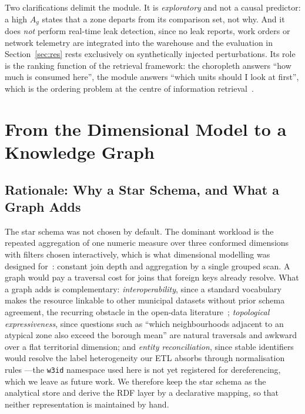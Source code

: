 \documentclass[runningheads]{llncs}
\newif\ifmarcarcambios
\newcommand{\icokg}[1]{\ifmarcarcambios\textcolor{nuevo}{#1}\else#1\fi}
\newenvironment{icokgblock}{\ifmarcarcambios\color{nuevo}\fi}{}
\renewcommand{\_}{\origunderscore\allowbreak}
\begin{document}
\begin{icokgblock}
Two clarifications delimit the module. It is \emph{exploratory} and not a causal
predictor: a high $A_g$ states that a zone departs from its comparison set, not
why. And it does \emph{not} perform real-time leak detection, since no leak
reports, work orders or network telemetry are integrated into the warehouse and
the evaluation in Section~\ref{sec:res} rests exclusively on synthetically
injected perturbations. Its role is the ranking function of the retrieval
framework: the choropleth answers ``how much is consumed here'', the module
answers ``which units should I look at first'', which is the ordering problem at
the centre of information retrieval~\cite{purves2018}.
\end{icokgblock}

\begin{icokgblock}
\section{From the Dimensional Model to a Knowledge Graph}
\label{sec:kg}

\subsection{Rationale: Why a Star Schema, and What a Graph Adds}

The star schema was not chosen by default. The dominant workload is the repeated
aggregation of one numeric measure over three conformed dimensions with filters
chosen interactively, which is what dimensional modelling was designed
for~\cite{kimball}: constant join depth and aggregation by a single grouped scan.
A graph would pay a traversal cost for joins that foreign keys already resolve.
What a graph adds is complementary: \emph{interoperability}, since a standard
vocabulary makes the resource linkable to other municipal datasets without prior schema
agreement, the recurring obstacle in the open-data literature~\cite{vetro2016}; \emph{topological expressiveness}, since
questions such as ``which neighbourhoods adjacent to an atypical zone also exceed
the borough mean'' are natural traversals and awkward over a flat territorial
dimension; and \emph{entity reconciliation}, since \icokg{stable identifiers would resolve
the label heterogeneity our ETL absorbs through normalisation rules ---the
\texttt{w3id} namespace used here is not yet registered for dereferencing, which
we leave as future work}. We
therefore keep the star schema as the analytical store and derive the RDF layer
by a declarative mapping, so that neither representation is maintained by hand.


\end{icokgblock}
\end{document}
